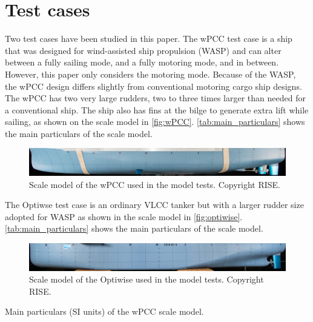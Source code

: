 \section{Test cases} \label{sec:test_cases}
Two test cases have been studied in this paper. The wPCC test case is a ship that was designed for wind-assisted ship propulsion (WASP) and can alter between a fully sailing mode, and a fully motoring mode, and in between. 
However, this paper only considers the motoring mode. Because of the WASP, the wPCC design differs slightly from conventional motoring cargo ship designs. The wPCC has two very large rudders, two to three times larger than needed for a conventional ship. The ship also has fins at the bilge to generate extra lift while sailing, as shown on the scale model in \autoref{fig:wPCC}.
\autoref{tab:main_particulars} shows the main particulars of the scale model. 
\begin{figure}[h]
    \centering
    \includegraphics[width=\columnwidth]{figures/5m2.jpg}
    \caption{Scale model of the wPCC used in the model tests. Copyright RISE.}
    \label{fig:wPCC}
\end{figure}

The Optiwse test case is an ordinary VLCC tanker but with a larger rudder size adopted for WASP as shown in the scale model in  \autoref{fig:optiwise}. \autoref{tab:main_particulars} shows the main particulars of the scale model. 
\begin{figure}[h]
    \centering
    \includegraphics[width=\columnwidth]{figures/optiwise.jpg}
    \caption{Scale model of the Optiwise used in the model tests. Copyright RISE.}
    \label{fig:optiwise}
\end{figure}
\begin{table}[h]
    \centering
    \caption{Main particulars (SI units) of the wPCC scale model.}
    \label{tab:main_particulars}
\end{table}
